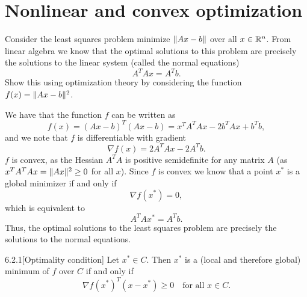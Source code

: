\section{Nonlinear and convex optimization}

\begin{exercise}
  Consider the least squares problem minimize $\lVert A x - b\rVert$ over all $x \in \mathbb{R}^n$.
  From linear algebra we know that the optimal solutions to this problem are precisely the solutions to the linear system (called the normal equations)
  \begin{equation}
    A^T A x = A^T b.
  \end{equation}
  Show this using optimization theory by considering the function $f(x) = \lVert A x - b\rVert^2$.
\end{exercise}

\begin{solution}
  We have that the function $f$ can be written as
  \begin{equation}
    f(x) = (A x - b)^T (A x - b) = x^T A^T A x - 2 b^T A x + b^T b,
  \end{equation}
  and we note that $f$ is differentiable with gradient
  \begin{equation}
    \nabla f(x) = 2 A^T A x - 2 A^T b.
  \end{equation}
  $f$ is convex, as the Hessian $A^T A$ is positive semidefinite for any matrix $A$ (as $x^T A^T A x = \lVert A x\rVert^2 \geq 0$ for all $x$).
  Since $f$ is convex we know that a point $x^*$ is a global minimizer if and only if
  \begin{equation}
    \nabla f(x^*) = 0,
  \end{equation}
  which is equivalent to
  \begin{equation}
    A^T A x^* = A^T b.
  \end{equation}
  Thus, the optimal solutions to the least squares problem are precisely the solutions to the normal equations.
\end{solution}

\begin{manualtheorem}{6.2.1}[Optimality condition]\label{thm:optim-cond}
  Let $x^* \in C$.
  Then $x^*$ is a (local and therefore global) minimum of $f$ over $C$ if and only if
  \begin{equation}\label{eq:optim-cond}
    \nabla f(x^*)^T (x - x^*) \geq 0 \quad \text{for all } x \in C.
  \end{equation}
\end{manualtheorem}

